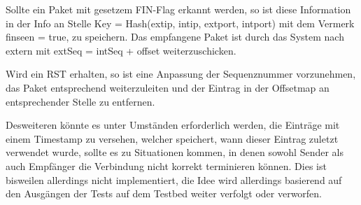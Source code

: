 \documentclass[../review_2.tex]{subfiles}
\begin{document}
Sollte ein Paket mit gesetzem FIN-Flag erkannt werden, so ist diese Information in der Info an Stelle Key = Hash(extip, intip, extport, intport) mit dem Vermerk finseen = true, zu speichern. Das empfangene Paket ist durch das System nach extern mit extSeq = intSeq + offset weiterzuschicken.

Wird ein RST erhalten, so ist eine Anpassung der Sequenznummer vorzunehmen, das Paket entsprechend weiterzuleiten und der Eintrag in der Offsetmap an entsprechender Stelle zu entfernen.

Desweiteren könnte es unter Umständen erforderlich werden, die Einträge mit einem Timestamp zu versehen, welcher speichert, wann dieser Eintrag zuletzt verwendet wurde, sollte es zu Situationen kommen, in denen sowohl Sender als auch Empfänger die Verbindung nicht korrekt terminieren können. Dies ist bisweilen allerdings nicht implementiert, die Idee wird allerdings basierend auf den Ausgängen der Tests auf dem Testbed weiter verfolgt oder verworfen.
\end{document}

